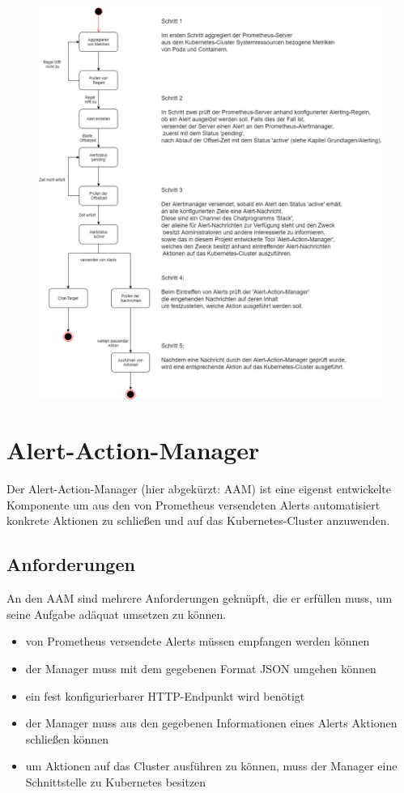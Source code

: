 \documentclass[a4paper,10pt]{scrartcl}
\begin{document}
\begin{figure}[htbp]
\hspace*{-3cm}
  \includegraphics[scale=.5,width=1.4\textwidth]{AAMStateChart.png}
\end{figure}
\pagebreak

\section{Alert-Action-Manager}

Der Alert-Action-Manager (hier abgekürzt: AAM) ist eine eigenst entwickelte Komponente um aus den von Prometheus versendeten Alerts automatisiert konkrete Aktionen zu schließen und auf das Kubernetes-Cluster anzuwenden.\\


\subsection{Anforderungen}

An den AAM sind mehrere Anforderungen geknüpft, die er erfüllen muss, um seine Aufgabe adäquat umsetzen zu können.

\begin{itemize}
\item von Prometheus versendete Alerts müssen empfangen werden können
\item der Manager muss mit dem gegebenen Format JSON umgehen können
\item ein fest konfigurierbarer HTTP-Endpunkt wird benötigt
\item der Manager muss  aus den gegebenen Informationen eines Alerts Aktionen schließen können
\item um Aktionen auf das Cluster ausführen zu können, muss der Manager eine Schnittstelle zu Kubernetes besitzen
\end{itemize}
\end{document}
